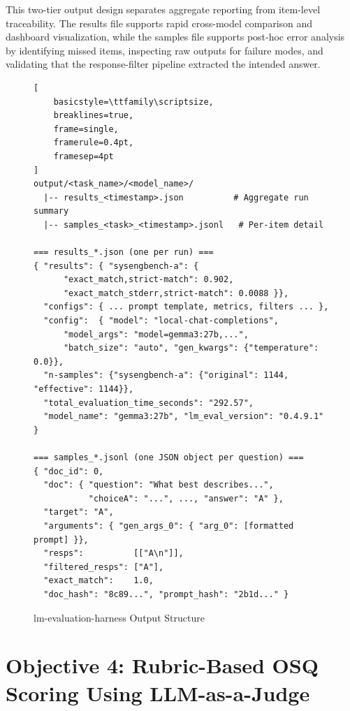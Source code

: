 This two-tier output design separates aggregate reporting from item-level traceability. The results file supports rapid cross-model comparison and dashboard visualization, while the samples file supports post-hoc error analysis by identifying missed items, inspecting raw outputs for failure modes, and validating that the response-filter pipeline extracted the intended answer.

\begin{figure}[htbp]
\centering
\begin{scriptsize}
\begin{lstlisting}[
    basicstyle=\ttfamily\scriptsize,
    breaklines=true,
    frame=single,
    framerule=0.4pt,
    framesep=4pt
]
output/<task_name>/<model_name>/
  |-- results_<timestamp>.json          # Aggregate run summary
  |-- samples_<task>_<timestamp>.jsonl   # Per-item detail

=== results_*.json (one per run) ===
{ "results": { "sysengbench-a": {
      "exact_match,strict-match": 0.902,
      "exact_match_stderr,strict-match": 0.0088 }},
  "configs": { ... prompt template, metrics, filters ... },
  "config":  { "model": "local-chat-completions",
      "model_args": "model=gemma3:27b,...",
      "batch_size": "auto", "gen_kwargs": {"temperature": 0.0}},
  "n-samples": {"sysengbench-a": {"original": 1144, "effective": 1144}},
  "total_evaluation_time_seconds": "292.57",
  "model_name": "gemma3:27b", "lm_eval_version": "0.4.9.1" }

=== samples_*.jsonl (one JSON object per question) ===
{ "doc_id": 0,
  "doc": { "question": "What best describes...",
           "choiceA": "...", ..., "answer": "A" },
  "target": "A",
  "arguments": { "gen_args_0": { "arg_0": [formatted prompt] }},
  "resps":          [["A\n"]],
  "filtered_resps": ["A"],
  "exact_match":    1.0,
  "doc_hash": "8c89...", "prompt_hash": "2b1d..." }
\end{lstlisting}
\end{scriptsize}
\caption{lm-evaluation-harness Output Structure}
\label{fig:lm-eval-output}
\end{figure}

\clearpage

\section{Objective 4: Rubric-Based OSQ Scoring Using LLM-as-a-Judge}
\label{sec:ch3_obj4}

